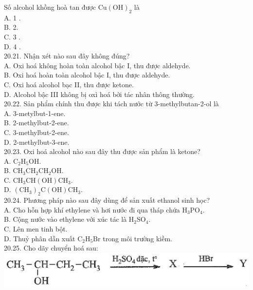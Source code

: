 \documentclass[10pt]{article}
\begin{document}
Số alcohol khồng hoà tan được $\mathrm{Cu}(\mathrm{OH})_{2}$ là\\
A. 1 .\\
B. 2.\\
C. 3 .\\
D. 4 .\\
20.21. Nhận xét nào sau đây không đúng?\\
A. Oxi hoá không hoàn toàn alcohol bậc I, thu được aldehyde.\\
B. Oxi hoá hoàn toàn alcohol bậc I, thu được aldehyde.\\
C. Oxi hoá alcohol bạc II, thu được ketone.\\
D. Alcohol bậc III không bị oxì hoá bởi tác nhân thông thường.\\
20.22. Sản phẩm chính thu được khi tách nước từ 3-methylbutan-2-ol là\\
A. 3-metylbut-1-ene.\\
B. 2-methylbut-2-ene.\\
C. 3-methylbut-2-ene.\\
D. 2-methylbut-3-ene.\\
20.23. Oxi hoá alcohol nào sau đây thu được sản phẩm là ketone?\\
A. $\mathrm{C}_{2} \mathrm{H}_{5} \mathrm{OH}$.\\
B. $\mathrm{CH}_{3} \mathrm{CH}_{2} \mathrm{CH}_{2} \mathrm{OH}$.\\
C. $\mathrm{CH}_{3} \mathrm{CH}(\mathrm{OH}) \mathrm{CH}_{3}$.\\
D. $\left(\mathrm{CH}_{3}\right)_{2} \mathrm{C}(\mathrm{OH}) \mathrm{CH}_{3}$.\\
20.24. Phương pháp nào sau đây dùng để sản xuất ethanol sinh học?\\
A. Cho hỗn hợp khí ethylene và hơi nước đi qua tháp chứa $\mathrm{H}_{3} \mathrm{PO}_{4}$.\\
B. Cộng nước vào ethylene với xúc tác là $\mathrm{H}_{2} \mathrm{SO}_{4}$.\\
C. Lên men tinh bột.\\
D. Thuỷ phân dẫn xuất $\mathrm{C}_{2} \mathrm{H}_{5} \mathrm{Br}$ trong môi trường kiềm.\\
20.25. Cho dãy chuyển hoá sau:\\
\includegraphics[max width=\textwidth, center]{2025_10_23_fa9073eecee116ad8cf2g-68}
\end{document}
